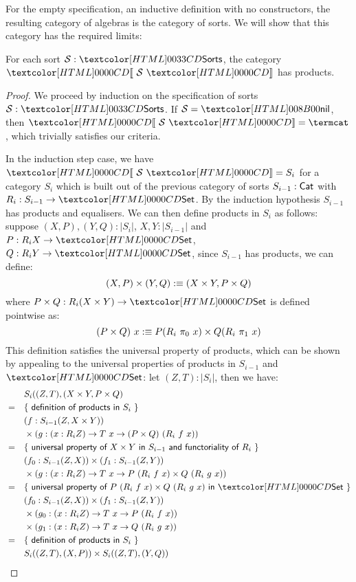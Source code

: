 For the empty specification, an inductive definition with no
constructors, the resulting category of algebras is the category of
sorts. We will show that this category has the required limits:

\begin{lemma}
\label{sorts-products}
  For each sort $\Ss : \sortsty$, the category $\SortCat{\Ss}$ has
  products.
\end{lemma}

\begin{proof}
  We proceed by induction on the specification of sorts
  $\Ss : \sortsty$.  If $\Ss = \sortsnil$, then $\SortCat{\Ss} = \termcat$,
  which trivially satisfies our criteria.

  In the induction step case, we have $\SortCat{\Ss} = S_i$ for a
  category $S_i$ which is built out of the previous category of sorts
  $S_{i-1} : \mathsf{Cat}$ with $R_i : S_{i-1} \to \Set$. By the induction
  hypothesis $S_{i-1}$ has products and equalisers. We can then define
  products in $S_{i}$ as follows: suppose $(X,P), (Y,Q) : | S_{i} |$,
  \ie $X, Y : | S_{i-1} |$ and $P : R_i X \to \Set$,
  $Q : R_i Y \to \Set$, since $S_{i-1}$ has products, we can define:
  \[
    (X,P) \times (Y,Q) :\equiv (X \times Y , P \times Q)
  \]
  where $P \times Q : R_i (X \times Y) \to \Set$ is defined pointwise
  as:
  \[
    (P \times Q)\ x :\equiv P (R_i\ \pi_0\ x) \times Q (R_i\ \pi_1\ x)
  \]
  This definition satisfies the universal property of products, which
  can be shown by appealing to the universal properties of products in
  $S_{i-1}$ and $\Set$: let $(Z,T) : | S_{i} |$, then we have:
  \begin{align*}
    &&&S_i((Z,T),(X \times Y, P \times Q) \\
    &=& &\reasontext{definition of products in $S_i$} \\
    &&& (f : S_{i-1}(Z,X \times Y)) \\
    &&& \times (g : (x : R_i Z) \to T\ x \to (P \times Q)\ (R_i\ f\ x)) \\
    &=& &\reasontext{universal property of $X \times Y$ in $S_{i-1}$ and functoriality of $R_i$} \\
    &&& (f_0 : S_{i-1}(Z,X)) \times (f_1 : S_{i-1}(Z,Y)) \\
    &&& \times (g : (x : R_iZ) \to T\ x \to P\ (R_i\ f\ x) \times Q\ (R_i\ g\ x)) \\
    &=& &\reasontext{universal property of $P\ (R_i\ f\ x) \times Q\ (R_i\ g\ x)$ in $\Set$} \\
    &&& (f_0 : S_{i-1}(Z,X)) \times (f_1 : S_{i-1}(Z,Y)) \\
    &&& \times (g_0 : (x : R_iZ) \to T\ x \to P\ (R_i\ f\ x)) \\
    &&& \times (g_1 : (x : R_iZ) \to T\ x \to Q\ (R_i\ g\ x)) \\
    &=& &\reasontext{definition of products in $S_i$} \\
    &&& S_i((Z,T),(X,P)) \times S_i((Z,T),(Y,Q))
  \end{align*}
\end{proof}

